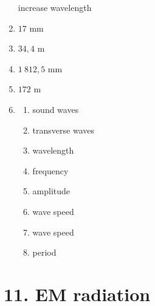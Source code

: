 \begin{multicols}{5}
\begin{enumerate}[itemsep=5pt, label=\textbf{\arabic*}. ]
increase wavelength
\item %
$17 \text{ mm}$
\item %
$34,4 \text{ m}$
\item %
$1~812,5 \text{ mm}$
\item %
$172 \text{ m}$
\item %
    \begin{enumerate}[noitemsep, label=\textbf{(\alph*)} ]
    \item sound waves
    \item transverse waves
\item wavelength
\item frequency
    \item amplitude
    \item wave speed
\item wave speed
\item period
    \end{enumerate}
  \end{enumerate}
\end{multicols}

\section {11. EM radiation}
% 
% 

